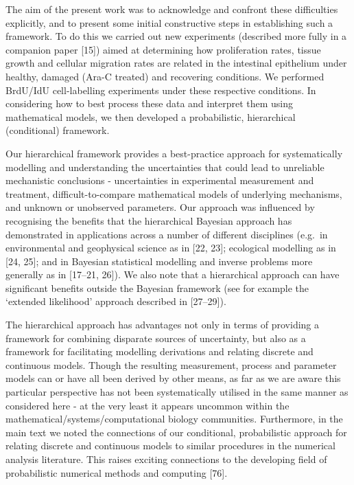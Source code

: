 \documentclass[10pt,letterpaper]{article}
\begin{document}
The aim of the present work was to acknowledge and confront these
difficulties explicitly, and to present some initial constructive steps
in establishing such a framework. To do this we carried out new
experiments (described more fully in a companion paper {[}15{]}) aimed
at determining how proliferation rates, tissue growth and cellular
migration rates are related in the intestinal epithelium under healthy,
damaged (Ara-C treated) and recovering conditions. We performed BrdU/IdU
cell-labelling experiments under these respective conditions. In
considering how to best process these data and interpret them using
mathematical models, we then developed a probabilistic, hierarchical
(conditional) framework.

Our hierarchical framework provides a best-practice approach for
systematically modelling and understanding the uncertainties that could
lead to unreliable mechanistic conclusions - uncertainties in
experimental measurement and treatment, difficult-to-compare
mathematical models of underlying mechanisms, and unknown or unobserved
parameters. Our approach was influenced by recognising the benefits that
the hierarchical Bayesian approach has demonstrated in applications
across a number of different disciplines (e.g.~in environmental and
geophysical science as in {[}22, 23{]}; ecological modelling as in
{[}24, 25{]}; and in Bayesian statistical modelling and inverse problems
more generally as in {[}17--21, 26{]}). We also note that a hierarchical
approach can have significant benefits outside the Bayesian framework
(see for example the `extended likelihood' approach described in
{[}27--29{]}).

The hierarchical approach has advantages not only in terms of providing
a framework for combining disparate sources of uncertainty, but also as
a framework for facilitating modelling derivations and relating discrete
and continuous models. Though the resulting measurement, process and
parameter models can or have all been derived by other means, as far as
we are aware this particular perspective has not been systematically
utilised in the same manner as considered here - at the very least it
appears uncommon within the mathematical/systems/computational biology
communities. Furthermore, in the main text we noted the connections of
our conditional, probabilistic approach for relating discrete and
continuous models to similar procedures in the numerical analysis
literature. This raises exciting connections to the developing field of
probabilistic numerical methods and computing {[}76{]}.
\end{document}
